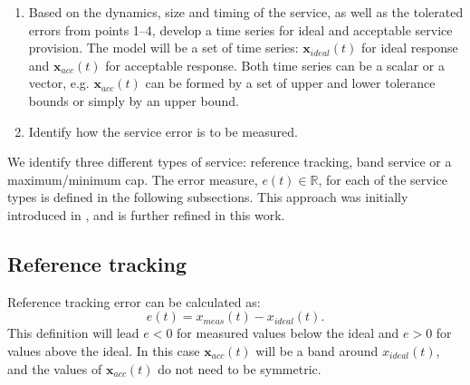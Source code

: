 \begin{enumerate}
  \item Based on the dynamics, size and timing of the service, as well as the tolerated errors from points 1--4, develop a time series for ideal and acceptable service provision. The model will be a set of time series: $\mathbf{x}_{ideal}(t)$ for ideal response and $\mathbf{x}_{acc}(t)$ for acceptable response. Both time series can be a scalar or a vector, e.g. $\mathbf{x}_{acc}(t)$ can be formed by a set of upper and lower tolerance bounds or simply by an upper bound.
  \item Identify how the service error is to be measured.
\end{enumerate}

We identify three different types of service: reference tracking, band service or a maximum/minimum cap. The error measure, $e(t) \in \mathbb{R}$, for each of the service types is defined in the following subsections. This approach was initially introduced in \cite{bondy2014performance}, and is further refined in this work. 



\subsection*{Reference tracking}
Reference tracking error can be calculated as:
\begin{equation}\label{eq:ref_error}
e(t) = x_{meas}(t) - x_{ideal}(t).
\end{equation}
This definition will lead $e<0$ for measured values below the ideal and $e>0$ for values above the ideal. In this case $\mathbf{x}_{acc}(t)$ will be a band around $x_{ideal}(t)$, and the values of $\mathbf{x}_{acc}(t)$ do not need to be symmetric.

